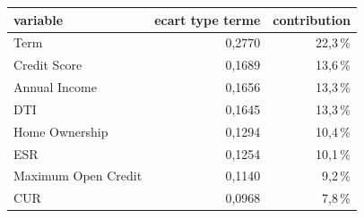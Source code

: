 \begin{tabular}{lrr}
\toprule
\textbf{variable} & \textbf{ecart type terme} & \textbf{contribution} \\
\midrule
Term & 0,2770 & 22,3\,\% \\
Credit Score & 0,1689 & 13,6\,\% \\
Annual Income & 0,1656 & 13,3\,\% \\
DTI & 0,1645 & 13,3\,\% \\
Home Ownership & 0,1294 & 10,4\,\% \\
ESR & 0,1254 & 10,1\,\% \\
Maximum Open Credit & 0,1140 & 9,2\,\% \\
CUR & 0,0968 & 7,8\,\% \\
\bottomrule
\end{tabular}
